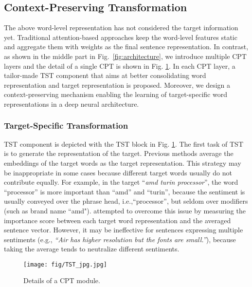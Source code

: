 \documentclass[11pt,a4paper]{article}
\begin{document}
\subsection{Context-Preserving Transformation}
\label{sec:cpt}
The above word-level representation has not considered the target information yet. Traditional attention-based approaches keep the word-level features static and aggregate them with weights as the final sentence representation. In contrast, as shown in the middle part in Fig.~\ref{fig:architecture}, we introduce multiple CPT layers and the detail of a single CPT is shown in Fig. \ref{fig:ast}. In each CPT layer, a tailor-made TST component that aims at better consolidating word representation and target representation is proposed. Moreover, we design a context-preserving mechanism enabling the learning of target-specific word representations in a deep neural architecture.

\subsubsection{Target-Specific Transformation}
TST component is depicted with the TST block in Fig. \ref{fig:ast}.
The first task of TST is to generate the representation of the target. Previous methods \cite{chen-EtAl:2017:EMNLP20171,liu-zhang:2017:EACLshort} average the embeddings of the target words as the target representation. This strategy may be inappropriate in some cases because different target words usually do not contribute equally. For example, in the target ``\textit{amd turin processor}'', the word ``processor'' is more important than ``amd'' and ``turin'', because the sentiment is usually conveyed over the phrase head, i.e.,``processor'', but seldom over modifiers (such as brand name ``amd").
\citet{ma2017interactive} attempted to overcome this issue by measuring the importance score between each target word representation and the averaged sentence vector. However, it may be ineffective for sentences expressing multiple sentiments (e.g., \textit{``Air has higher resolution but the fonts are small.''}), because taking the average tends to neutralize different sentiments. 

\begin{figure}[!t]
    \centering
    \texttt{[image: fig/TST\_jpg.jpg]}
\caption{Details of a CPT module.}
    \label{fig:ast}
\end{figure}
\end{document}
